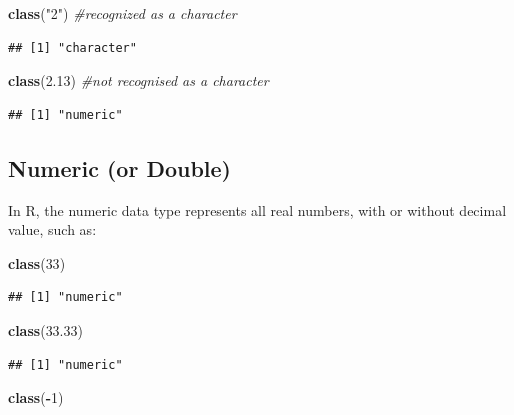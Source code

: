 \documentclass[
]{book}
\newenvironment{Shaded}{\begin{snugshade}}{\end{snugshade}}
\newcommand{\CommentTok}[1]{\textcolor[rgb]{0.56,0.35,0.01}{\textit{#1}}}
\newcommand{\DecValTok}[1]{\textcolor[rgb]{0.00,0.00,0.81}{#1}}
\newcommand{\FloatTok}[1]{\textcolor[rgb]{0.00,0.00,0.81}{#1}}
\newcommand{\FunctionTok}[1]{\textcolor[rgb]{0.13,0.29,0.53}{\textbf{#1}}}
\newcommand{\NormalTok}[1]{#1}
\newcommand{\SpecialCharTok}[1]{\textcolor[rgb]{0.81,0.36,0.00}{\textbf{#1}}}
\newcommand{\StringTok}[1]{\textcolor[rgb]{0.31,0.60,0.02}{#1}}
\begin{document}
\begin{Shaded}
\begin{Highlighting}[]
\FunctionTok{class}\NormalTok{(}\StringTok{"2"}\NormalTok{) }\CommentTok{\#recognized as a character}
\end{Highlighting}
\end{Shaded}

\begin{verbatim}
## [1] "character"
\end{verbatim}

\begin{Shaded}
\begin{Highlighting}[]
\FunctionTok{class}\NormalTok{(}\FloatTok{2.13}\NormalTok{) }\CommentTok{\#not recognised as a character}
\end{Highlighting}
\end{Shaded}

\begin{verbatim}
## [1] "numeric"
\end{verbatim}

\subsection{Numeric (or Double)}\label{numeric-or-double}

In R, the numeric data type represents all real numbers, with or without decimal value, such as:

\begin{Shaded}
\begin{Highlighting}[]
\FunctionTok{class}\NormalTok{(}\DecValTok{33}\NormalTok{)}
\end{Highlighting}
\end{Shaded}

\begin{verbatim}
## [1] "numeric"
\end{verbatim}

\begin{Shaded}
\begin{Highlighting}[]
\FunctionTok{class}\NormalTok{(}\FloatTok{33.33}\NormalTok{)}
\end{Highlighting}
\end{Shaded}

\begin{verbatim}
## [1] "numeric"
\end{verbatim}

\begin{Shaded}
\begin{Highlighting}[]
\FunctionTok{class}\NormalTok{(}\SpecialCharTok{{-}}\DecValTok{1}\NormalTok{)}
\end{Highlighting}
\end{Shaded}
\end{document}
